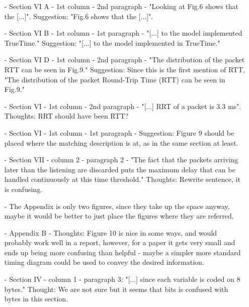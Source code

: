 \begin{itemize}
\item[-]Section VI A - 1st column - 2nd paragraph - "Looking at Fig.6 shows that the [...]".
Suggestion: "Fig.6 shows that the [...]".\\
\item[-]Section VI B - 1st column - 1st paragraph - "[...] to the model implemented TrueTime."
Suggestion: "[...] to the model implemented in TrueTime."\\
\item[-]Section VI D - 1st column - 2nd paragraph - "The distribution of the packet RTT can be seen in Fig.9."
Suggestion: Since this is the first mention of RTT, "The distribution of the packet Round-Trip Time (RTT) can be seen in Fig.9."\\
\item[-]Section VI - 1st column - 2nd paragraph - "[...] RRT of a packet is 3.3 ms".
Thoughts: RRT should have been RTT?\\
\item[-]Section VI - 1st column - 1st paragraph - 
Suggestion: Figure 9 should be placed where the matching description is at, as in the same section at least.\\
\item[-]
Section VII - column 2 - paragraph 2 - "The fact that the packets arriving later than the listening are discarded puts the maximum delay that can be handled continuously at this time threshold."
Thoughts: Rewrite sentence, it is confusing.\\
\item[-]The Appendix is only two figures, since they take up the space anyway, maybe it would be better to just place the figures where they are referred.\\
\item[-] Appendix B -
Thoughts: Figure 10 is nice in some ways, and would probably work well in a report, however, for a paper it gets very small and ends up being more confusing than helpful - maybe a simpler more standard timing diagram could be used to convey the desired information.\\
\item[-]Section IV - column 1 - paragraph 3: "[...] since each variable is coded on 8 bytes."
Thought: We are not sure but it seems that bits is confused with bytes in this section.						
\end{itemize}
